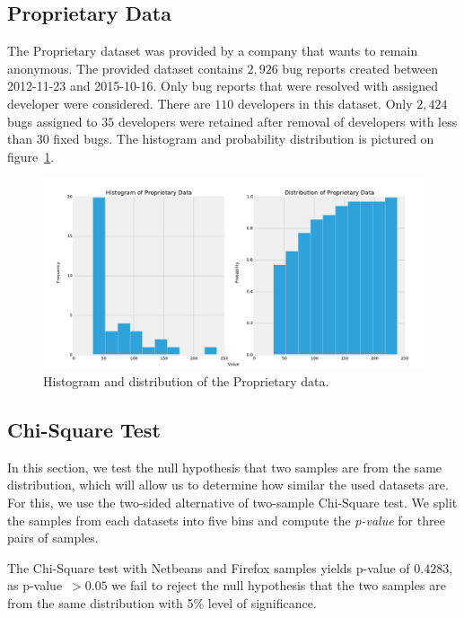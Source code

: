 \subsection{Proprietary Data}

The Proprietary dataset was provided by a company that wants to remain anonymous. The provided dataset contains $2,926$ bug reports created between 2012-11-23 and 2015-10-16. Only bug reports that were resolved with assigned developer were considered. There are $110$ developers in this dataset. Only $2,424$ bugs assigned to $35$ developers were retained after removal of developers with less than $30$ fixed bugs. The histogram and probability distribution is pictured on figure~\ref{fig:datasets.proprietary.dist}.

\begin{figure}[htbp]
    \centering
        \includegraphics[width=\textwidth]{./images/distribution/proprietary.pdf}
    \caption{Histogram and distribution of the Proprietary data.}
    \label{fig:datasets.proprietary.dist}
\end{figure}

\subsection{Chi-Square Test}

In this section, we test the null hypothesis that two samples are from the same distribution, which will allow us to determine how similar the used datasets are. For this, we use the two-sided alternative of two-sample Chi-Square test. We split the samples from each datasets into five bins and compute the \textit{p-value} for three pairs of samples.

The Chi-Square test with Netbeans and Firefox samples yields p-value of $0.4283$, as p-value~$> 0.05$ we fail to reject the null hypothesis that the two samples are from the same distribution with 5\% level of significance.

